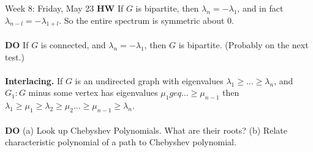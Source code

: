 \documentclass[12pt]{article}
\theoremstyle{remark}
\begin{document}
\begin{section}{Week 8: Friday, May 23}
\textbf{HW} If $G$ is bipartite, then $\lambda_n = - \lambda_1$, and in fact $\lambda_{n-l} = - \lambda_{1 + l}$. So the entire spectrum is symmetric about $0$. 
\\\\
\textbf{DO} If $G$ is connected, and $\lambda_n = - \lambda_1$, then $G$ is bipartite. (Probably on the next test.)
\\\\
\textbf{Interlacing.} If $G$ is an undirected graph with eigenvalues $\lambda_1 \geq \ldots \geq \lambda_n$, and $G_1 : G$ minus some vertex has eigenvalues $\mu_1 geq \ldots \geq \mu_{n-1}$ then $\lambda_1 \geq \mu_1 \geq \lambda_2 \geq \mu_2 \ldots \geq \mu_{n-1} \geq \lambda_n$. 
\\\\
\textbf{DO} (a) Look up Chebyshev Polynomials. What are their roots? (b) Relate characteristic polynomial of a path to Chebyshev polynomial.
\end{section}
\newpage
\end{document}
